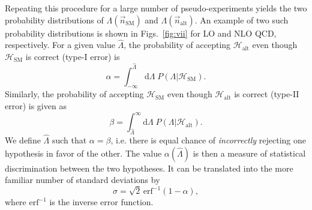 \documentclass[preprint]{JHEP3} %
\newcommand{\SM}{\mathrm{SM}}
\newcommand{\alt}{\mathrm{alt}}
\def\hLambda {\hat{\Lambda}}
\def\erf{\mathrm{erf}}
\def\HSM{\mathcal{H}_{\mathrm{SM}}}
\def\Halt{\mathcal{H}_{\mathrm{alt}}}
\newcommand{\ee}{\end{eqnarray}}
\begin{document}
Repeating this procedure for a large number of pseudo-experiments yields the two probability distributions of $\Lambda(\vec{n}_\mathrm{SM})$ and $\Lambda(\vec{n}_\mathrm{alt})$. 
An example of two such probability distributions is shown in Figs.~\ref{fig:vii} for LO and NLO QCD, respectively. 
For a given value $\hat{\Lambda}$, the probability of accepting $\mathcal{H}_{\alt}$ even though $\mathcal{H}_{\SM}$ is correct (type-I error) is
\begin{equation}
    \alpha = \int^{\hLambda}_{-\infty} \mathrm{d}\Lambda \; P(\Lambda | {\HSM}).
\end{equation}
Similarly, the probability of accepting $\mathcal{H}_{\SM}$ even though $\mathcal{H}_{\alt}$ is correct (type-II error) is given as 
\begin{equation}
    \beta = \int_{\hLambda}^{\infty} \mathrm{d}\Lambda \; P(\Lambda|\Halt).
\end{equation}
We define $\hLambda$ such that $\alpha=\beta$, i.e. there is equal chance of {\it incorrectly} rejecting one hypothesis in favor of the other. 
The value $\alpha(\hLambda)$ is then a measure of statistical discrimination between the two hypotheses. 
It can be translated into the more familiar number of standard deviations by 
\begin{equation}
\sigma = \sqrt{2} \, \erf^{-1}(1-\alpha),
\end{equation}
where $\erf^{-1}$ is the inverse error function. 
\end{document}
